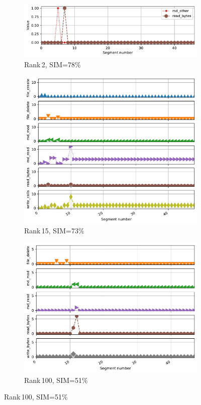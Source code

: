 \documentclass{jhps}
\begin{document}
\begin{figure}[bt]
\begin{subfigure}{0.3\textwidth}
\centering
\includegraphics[width=\textwidth]{job_similarities_5024292-out/bin_aggzeros-0.7755--1timeseries8010306}
\caption{Rank\,2, SIM=78\%}
\end{subfigure}
\begin{subfigure}{0.3\textwidth}
\centering
\includegraphics[width=\textwidth]{job_similarities_5024292-out/bin_aggzeros-0.7347--14timeseries4498983}
\caption{Rank\,15, SIM=73\%}
\end{subfigure}
\begin{subfigure}{0.3\textwidth}
\centering
\includegraphics[width=\textwidth]{job_similarities_5024292-out/bin_aggzeros-0.5102--99timeseries5120077}
\caption{Rank\,100, SIM=51\% }
\end{subfigure}


\end{figure}
\end{document}
